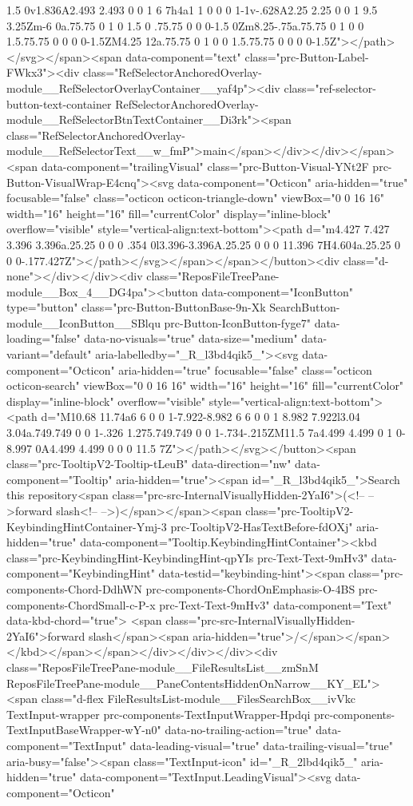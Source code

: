 {{{{{{{1.5 0v1.836A2.493 2.493 0 0 1 6 7h4a1 1 0 0 0 1-1v-.628A2.25 2.25 0 0 1 9.5 3.25Zm-6 0a.75.75 0 1 0 1.5 0 .75.75 0 0 0-1.5 0Zm8.25-.75a.75.75 0 1 0 0 1.5.75.75 0 0 0 0-1.5ZM4.25 12a.75.75 0 1 0 0 1.5.75.75 0 0 0 0-1.5Z"></path></svg></span><span data-component="text" class="prc-Button-Label-FWkx3"><div class="RefSelectorAnchoredOverlay-module__RefSelectorOverlayContainer__yaf4p"><div class="ref-selector-button-text-container RefSelectorAnchoredOverlay-module__RefSelectorBtnTextContainer__Di3rk"><span class="RefSelectorAnchoredOverlay-module__RefSelectorText__w_fmP">main</span></div></div></span><span data-component="trailingVisual" class="prc-Button-Visual-YNt2F prc-Button-VisualWrap-E4cnq"><svg data-component="Octicon" aria-hidden="true" focusable="false" class="octicon octicon-triangle-down" viewBox="0 0 16 16" width="16" height="16" fill="currentColor" display="inline-block" overflow="visible" style="vertical-align:text-bottom"><path d="m4.427 7.427 3.396 3.396a.25.25 0 0 0 .354 0l3.396-3.396A.25.25 0 0 0 11.396 7H4.604a.25.25 0 0 0-.177.427Z"></path></svg></span></span></button><div class="d-none"></div></div><div class="ReposFileTreePane-module__Box_4__DG4pa"><button data-component="IconButton" type="button" class="prc-Button-ButtonBase-9n-Xk SearchButton-module__IconButton__SBlqu prc-Button-IconButton-fyge7" data-loading="false" data-no-visuals="true" data-size="medium" data-variant="default" aria-labelledby="_R_l3bd4qik5_"><svg data-component="Octicon" aria-hidden="true" focusable="false" class="octicon octicon-search" viewBox="0 0 16 16" width="16" height="16" fill="currentColor" display="inline-block" overflow="visible" style="vertical-align:text-bottom"><path d="M10.68 11.74a6 6 0 0 1-7.922-8.982 6 6 0 0 1 8.982 7.922l3.04 3.04a.749.749 0 0 1-.326 1.275.749.749 0 0 1-.734-.215ZM11.5 7a4.499 4.499 0 1 0-8.997 0A4.499 4.499 0 0 0 11.5 7Z"></path></svg></button><span class="prc-TooltipV2-Tooltip-tLeuB" data-direction="nw" data-component="Tooltip" aria-hidden="true"><span id="_R_l3bd4qik5_">Search this repository<span class="prc-src-InternalVisuallyHidden-2YaI6">(<!-- -->forward slash<!-- -->)</span></span><span class="prc-TooltipV2-KeybindingHintContainer-Ymj-3 prc-TooltipV2-HasTextBefore-fdOXj" aria-hidden="true" data-component="Tooltip.KeybindingHintContainer"><kbd class="prc-KeybindingHint-KeybindingHint-qpYIs prc-Text-Text-9mHv3" data-component="KeybindingHint" data-testid="keybinding-hint"><span class="prc-components-Chord-DdhWN prc-components-ChordOnEmphasis-O-4BS prc-components-ChordSmall-c-P-x prc-Text-Text-9mHv3" data-component="Text" data-kbd-chord="true"> <span class="prc-src-InternalVisuallyHidden-2YaI6">forward slash</span><span aria-hidden="true">/</span></span></kbd></span></span></div></div></div><div class="ReposFileTreePane-module__FileResultsList__zmSnM ReposFileTreePane-module__PaneContentsHiddenOnNarrow__KY_EL"><span class="d-flex FileResultsList-module__FilesSearchBox__ivVkc TextInput-wrapper prc-components-TextInputWrapper-Hpdqi prc-components-TextInputBaseWrapper-wY-n0" data-no-trailing-action="true" data-component="TextInput" data-leading-visual="true" data-trailing-visual="true" aria-busy="false"><span class="TextInput-icon" id="_R_2lbd4qik5_" aria-hidden="true" data-component="TextInput.LeadingVisual"><svg data-component="Octicon" }}}}}}}
